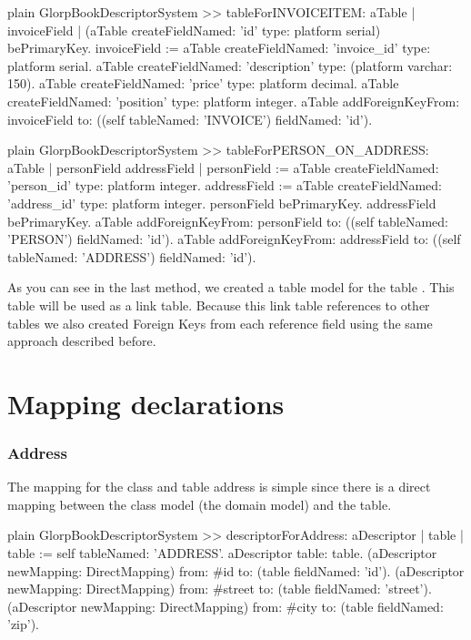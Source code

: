 \documentclass[10pt,twoside,english]{_support/latex/sbabook/sbabook}
\begin{document}
\begin{displaycode}{plain}
GlorpBookDescriptorSystem >> tableForINVOICEITEM: aTable
	| invoiceField |
	(aTable createFieldNamed: 'id' type: platform serial) bePrimaryKey.
	invoiceField := aTable createFieldNamed: 'invoice_id' type: platform serial.
	aTable createFieldNamed: 'description' type: (platform varchar: 150).
	aTable createFieldNamed: 'price' type: platform decimal.
	aTable createFieldNamed: 'position' type: platform integer.
	aTable
		addForeignKeyFrom: invoiceField
		to: ((self tableNamed: 'INVOICE') fieldNamed: 'id').
\end{displaycode}

\begin{displaycode}{plain}
GlorpBookDescriptorSystem >> tableForPERSON_ON_ADDRESS: aTable
	| personField addressField |
	personField := aTable
		createFieldNamed: 'person_id'
		type: platform integer.
	addressField := aTable
		createFieldNamed: 'address_id'
		type: platform integer.
	personField bePrimaryKey.
	addressField bePrimaryKey.
	aTable
		addForeignKeyFrom: personField
		to: ((self tableNamed: 'PERSON') fieldNamed: 'id').
	aTable
		addForeignKeyFrom: addressField
		to: ((self tableNamed: 'ADDRESS') fieldNamed: 'id').
\end{displaycode}

As you can see in the last method, we created a table model for the table
. This table will be used as a link table. Because
this link table references to other tables we also created Foreign Keys
from each reference field using the same approach described before.
\section{Mapping declarations}\subsubsection{Address}
The mapping for the class and table address is simple since there is a direct
mapping between the class model (the domain model) and the table.

\begin{displaycode}{plain}
GlorpBookDescriptorSystem >> descriptorForAddress: aDescriptor
	| table |
	table := self tableNamed: 'ADDRESS'.
	aDescriptor table: table.
	(aDescriptor newMapping: DirectMapping)
		from: #id
		to: (table fieldNamed: 'id').
	(aDescriptor newMapping: DirectMapping)
		from: #street
		to: (table fieldNamed: 'street').
	(aDescriptor newMapping: DirectMapping)
		from: #city
		to: (table fieldNamed: 'zip').
\end{displaycode}
\end{document}
